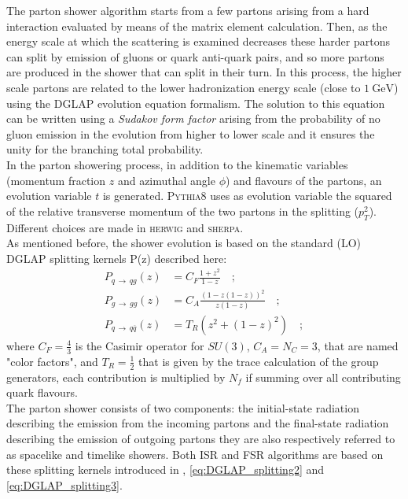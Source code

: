 The parton shower algorithm starts from a few partons arising from a hard interaction evaluated by means of the matrix element calculation. Then, as the energy scale at which the scattering is examined decreases these harder partons can split by emission of gluons or quark anti-quark pairs, and so more partons are produced in the shower that can split in their turn. In this process, the higher scale partons are related to the lower hadronization energy scale (close to $1 \ \mathrm{GeV}$) using the DGLAP evolution equation formalism. The solution to this equation can be written using a \textit{Sudakov form factor} arising from the probability of no gluon emission in the evolution from higher to lower scale and it ensures the unity for the branching total probability.
\\
In the parton showering process, in addition to the kinematic variables (momentum fraction $z$ and azimuthal angle $\phi$) and flavours of the partons, an evolution variable $t$ is generated. \textsc{Pythia8} uses as  evolution variable the squared of the relative transverse momentum of the two partons in the splitting ($p_T^2$). Different choices are made in \textsc{herwig} and \textsc{sherpa}.
\\
As mentioned before, the shower evolution is based on the standard (LO) DGLAP splitting kernels P(z) described here:
\begin{align}
P_{q\,\rightarrow\,qg}(z) & = C_F\frac{1+z^2}{1-z}\quad ; \label{eq:DGLAP_splitting1}\\
P_{g\,\rightarrow\,gg}(z) & = C_A\frac{(1-z(1-z))^2}{z(1-z)}\quad ; \label{eq:DGLAP_splitting2}\\
P_{q\,\rightarrow\,q\overline{q}}(z) & = T_R(z^2+(1-z)^2)\quad ; \label{eq:DGLAP_splitting3}
\end{align} 
where $C_F=\frac{4}{3}$ is the Casimir operator for $SU(3)$, $C_A=N_C=3$, that are named "color factors", and $T_R=\frac{1}{2}$ that is given by the trace calculation of the group generators, each contribution is multiplied by $N_f$ if summing over all contributing quark flavours.
\\
The parton shower consists of two components: the initial-state radiation describing the emission from the incoming partons and the final-state radiation describing the emission of outgoing partons they are also respectively referred to as spacelike and timelike showers.
Both ISR and FSR algorithms are based on these splitting kernels introduced in , \ref{eq:DGLAP_splitting2} and \ref{eq:DGLAP_splitting3}.
